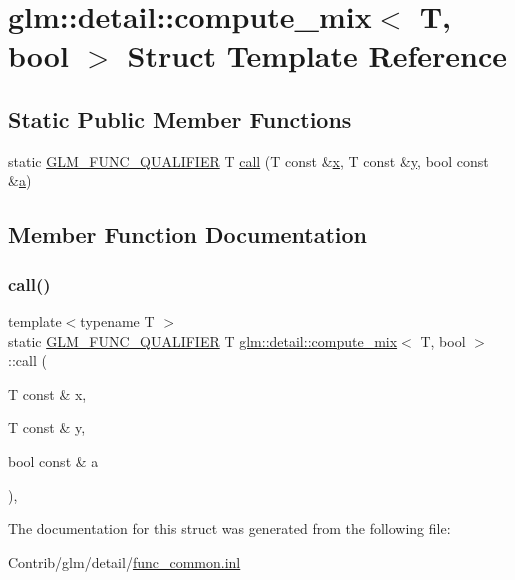 \hypertarget{structglm_1_1detail_1_1compute__mix_3_01_t_00_01bool_01_4}{}\section{glm\+:\+:detail\+:\+:compute\+\_\+mix$<$ T, bool $>$ Struct Template Reference}
\label{structglm_1_1detail_1_1compute__mix_3_01_t_00_01bool_01_4}
\subsection*{Static Public Member Functions}
\begin{DoxyCompactItemize}
\item 
static \mbox{\hyperlink{setup_8hpp_a33fdea6f91c5f834105f7415e2a64407}{G\+L\+M\+\_\+\+F\+U\+N\+C\+\_\+\+Q\+U\+A\+L\+I\+F\+I\+ER}} T \mbox{\hyperlink{structglm_1_1detail_1_1compute__mix_3_01_t_00_01bool_01_4_a7a83cf7bd102239b974faf18137d8c63}{call}} (T const \&\mbox{\hyperlink{_s_d_l__opengl_8h_ad0e63d0edcdbd3d79554076bf309fd47}{x}}, T const \&\mbox{\hyperlink{_s_d_l__opengl_8h_a1675d9d7bb68e1657ff028643b4037e3}{y}}, bool const \&\mbox{\hyperlink{_s_d_l__opengl__glext_8h_a3309789fc188587d666cda5ece79cf82}{a}})
\end{DoxyCompactItemize}


\subsection{Member Function Documentation}
\mbox{\label{structglm_1_1detail_1_1compute__mix_3_01_t_00_01bool_01_4_a7a83cf7bd102239b974faf18137d8c63}} 
\subsubsection{\texorpdfstring{call()}{call()}}
{\footnotesize\ttfamily template$<$typename T $>$ \\
static \mbox{\hyperlink{setup_8hpp_a33fdea6f91c5f834105f7415e2a64407}{G\+L\+M\+\_\+\+F\+U\+N\+C\+\_\+\+Q\+U\+A\+L\+I\+F\+I\+ER}} T \mbox{\hyperlink{structglm_1_1detail_1_1compute__mix}{glm\+::detail\+::compute\+\_\+mix}}$<$ T, bool $>$\+::call (\begin{DoxyParamCaption}\item[{T const \&}]{x,  }\item[{T const \&}]{y,  }\item[{bool const \&}]{a }\end{DoxyParamCaption})\hspace{0.3cm}{\ttfamily [inline]}, {\ttfamily [static]}}



The documentation for this struct was generated from the following file\+:\begin{DoxyCompactItemize}
\item 
Contrib/glm/detail/\mbox{\hyperlink{func__common_8inl}{func\+\_\+common.\+inl}}\end{DoxyCompactItemize}
